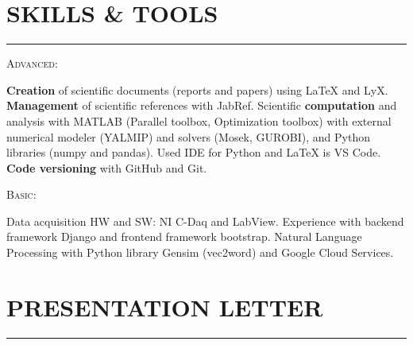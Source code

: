 \documentclass[10pt]{article}
\newcommand{\cvsection}[1]{\section*{\centering\normalsize\uppercase{#1}}\vspace{-16pt}\rule{\linewidth}{0.2pt}\vspace{6pt}}
\begin{document}
\cvsection{Skills \& Tools}
{\textsc{Advanced:}\par}
\textbf{Creation} of scientific documents (reports and papers) using LaTeX and LyX. \textbf{Management} of scientific references with JabRef.
Scientific \textbf{computation} and analysis with MATLAB (Parallel toolbox, Optimization toolbox) with external numerical modeler (YALMIP) and solvers (Mosek, GUROBI), and Python libraries (numpy and pandas).
Used IDE for Python and LaTeX is VS Code. \textbf{Code versioning} with GitHub and Git.

{\textsc{Basic:}\par}
Data acquisition HW and SW: NI C-Daq and LabView. Experience with backend framework Django and frontend framework bootstrap. Natural Language Processing with Python library Gensim (vec2word) and Google Cloud Services.

\cvsection{Presentation letter}




\end{document}
